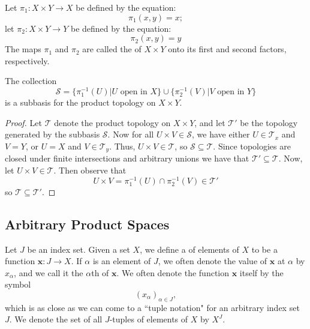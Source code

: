 \documentclass[12pt, a4paper, oneside, openright, titlepage]{book}
\begin{document}
\begin{definition}
    Let $\pi_1:X\times Y\rightarrow X$ be defined by the equation: \begin{equation*}
        \pi_1(x,y) = x;
    \end{equation*}
    let $\pi_2:X\times Y\rightarrow Y$ be defined by the equation: \begin{equation*}
        \pi_2(x,y) = y
    \end{equation*}
    The maps $\pi_1$ and $\pi_2$ are called the  of $X\times Y$ onto its first and second factors, respectively.
\end{definition}


\begin{theorem}
    The collection \begin{equation*}
        \mathcal{S} = \{\pi_1^{-1}(U)\vert U\text{ open in }X\}\cup\{\pi_2^{-1}(V)\vert V\text{ open in }Y\}
    \end{equation*}
    is a subbasis for the product topology on $X\times Y$.
\end{theorem}
\begin{proof}
    Let $\mathcal{T}$ denote the product topology on $X\times Y$, and let $\mathcal{T}'$ be the topology generated by the subbasis $\mathcal{S}$. Now for all $U \times V \in \mathcal{S}$, we have either $U \in \mathcal{T}_x$ and $V = Y$, or $U = X$ and $V \in \mathcal{T}_y$. Thus, $U\times V \in \mathcal{T}$, so $\mathcal{S} \subseteq \mathcal{T}$. Since topologies are closed under finite intersections and arbitrary unions we have that $\mathcal{T}' \subseteq \mathcal{T}$. Now, let $U \times V \in \mathcal{T}$. Then observe that \begin{equation*}
        U\times V = \pi_1^{-1}(U)\cap\pi_2^{-1}(V) \in \mathcal{T}'
    \end{equation*}
    so $\mathcal{T} \subseteq \mathcal{T}'$.
\end{proof}


\subsection{Arbitrary Product Spaces}

\begin{definition}
    Let $J$ be an index set. Given a set $X$, we define a  of elements of $X$ to be a function $\mathbf{x}:J\rightarrow X$. If $\alpha$ is an element of $J$, we often denote the value of $\mathbf{x}$ at $\alpha$ by $x_{\alpha}$, and we call it the $\alpha$th  of $\mathbf{x}$. We often denote the function $\mathbf{x}$ itself by the symbol \begin{equation*}
        (x_{\alpha})_{\alpha \in J},
    \end{equation*}
    which is as close as we can come to a ``tuple notation" for an arbitrary index set $J$. We denote the set of all $J$-tuples of elements of $X$ by $X^J$.
\end{definition}
\end{document}
